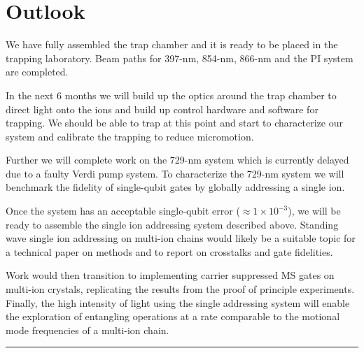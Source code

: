 \documentclass[12pt]{iopart}
\begin{document}

\section{Outlook}
We have fully assembled the trap chamber and it is ready to be placed
in the trapping laboratory.  Beam paths for 397-nm, 854-nm, 866-nm and
the PI system are completed.

In the next 6 months we will build up the optics around the trap
chamber to direct light onto the ions and build up control hardware
and software for trapping. We should be able to trap at this point and
start to characterize our system and calibrate the trapping to reduce
micromotion.

Further we will complete work on the 729-nm system which is currently
delayed due to a faulty Verdi pump system. To characterize the 729-nm
system we will benchmark the fidelity of single-qubit gates by
globally addressing a single ion.

Once the system has an acceptable single-qubit error
($\approx 1\times10^{-3}$), we will be ready to assemble the single ion
addressing system described above. Standing wave single ion addressing
on multi-ion chains would likely be a suitable topic for a technical
paper on methods and to report on crosstalks and gate fidelities.

Work would then transition to implementing carrier suppressed MS gates
on multi-ion crystals, replicating the results from the proof of
principle experiments. Finally, the high intensity of light using the
single addressing system will enable the exploration of entangling
operations at a rate comparable to the motional mode frequencies of a
multi-ion chain.

\vspace{2em}
\hrule

\end{document}
